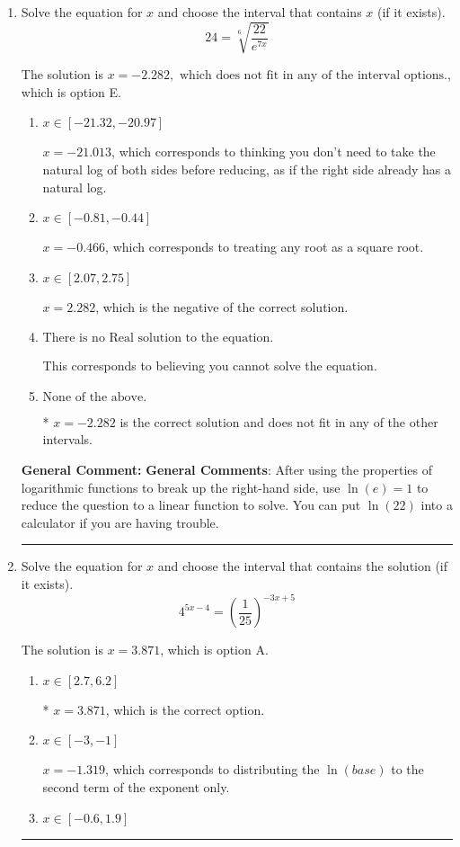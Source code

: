\documentclass{extbook}[14pt]
\newcommand{\litem}[1]{\item #1

\rule{\textwidth}{0.4pt}}
\begin{document}
\begin{enumerate}\litem{
 Solve the equation for $x$ and choose the interval that contains $x$ (if it exists).
\[  24 = \sqrt[6]{\frac{22}{e^{7x}}} \]

The solution is \( x = -2.282, \text{ which does not fit in any of the interval options.} \), which is option E.\begin{enumerate}[label=\Alph*.]
\item \( x \in [-21.32, -20.97] \)

$x = -21.013$, which corresponds to thinking you don't need to take the natural log of both sides before reducing, as if the right side already has a natural log.
\item \( x \in [-0.81, -0.44] \)

$x = -0.466$, which corresponds to treating any root as a square root.
\item \( x \in [2.07, 2.75] \)

$x = 2.282$, which is the negative of the correct solution.
\item \( \text{There is no Real solution to the equation.} \)

This corresponds to believing you cannot solve the equation.
\item \( \text{None of the above.} \)

* $x = -2.282$ is the correct solution and does not fit in any of the other intervals.
\end{enumerate}

\textbf{General Comment:} \textbf{General Comments}: After using the properties of logarithmic functions to break up the right-hand side, use $\ln(e) = 1$ to reduce the question to a linear function to solve. You can put $\ln(22)$ into a calculator if you are having trouble.
}
\litem{
Solve the equation for $x$ and choose the interval that contains the solution (if it exists).
\[ 4^{5x-4} = \left(\frac{1}{25}\right)^{-3x+5} \]

The solution is \( x = 3.871 \), which is option A.\begin{enumerate}[label=\Alph*.]
\item \( x \in [2.7, 6.2] \)

* $x = 3.871$, which is the correct option.
\item \( x \in [-3, -1] \)

$x = -1.319$, which corresponds to distributing the $\ln(base)$ to the second term of the exponent only.
\item \( x \in [-0.6, 1.9] \)


\end{enumerate}}
\end{enumerate}
\end{document}
